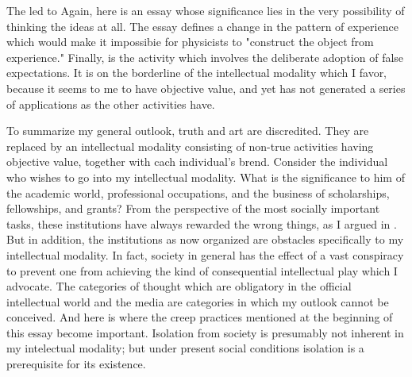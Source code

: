 The  led to 
 Again, here is an essay whose 
significance lies in the very possibility of thinking the ideas at all. The essay 
defines a change in the pattern of experience which would make it 
impossibie for physicists to "construct the object from experience." Finally, 
 is the activity which involves the deliberate adoption of 
false expectations. It is on the borderline of the intellectual modality which I 
favor, because it seems to me to have objective value, and yet has not 
generated a series of applications as the other activities have. 

To summarize my general outlook, truth and art are discredited. They 
are replaced by an intellectual modality consisting of non-true activities 
having objective value, together with cach individual's brend. Consider the 
individual who wishes to go into my intellectual modality. What is the 
significance to him of the academic world, professional occupations, and the 
business of scholarships, fellowships, and grants? From the perspective of 
the most socially important tasks, these institutions have always rewarded 
the wrong things, as I argued in . But in addition, the 
institutions as now organized are obstacles specifically to my intellectual 
modality. In fact, society in general has the effect of a vast conspiracy to 
prevent one from achieving the kind of consequential intellectual play which 
I advocate. The categories of thought which are obligatory in the official
intellectual world and the media are categories in which my outlook cannot 
be conceived. And here is where the creep practices mentioned at the 
beginning of this essay become important. Isolation from society is 
presumably not inherent in my intelectual modality; but under present 
social conditions isolation is a prerequisite for its existence. 

